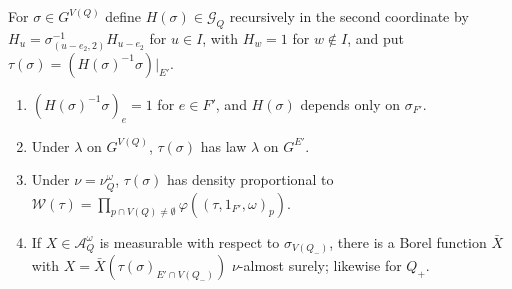 \begin{lemma}\label{lem:axial}
For $\sigma\in G^{V(Q)}$ define $H(\sigma)\in\mathcal G_Q$ recursively in the
second coordinate by $H_u=\sigma_{(u-e_2,2)}^{-1}H_{u-e_2}$ for $u\in I$, with
$H_w=1$ for $w\notin I$, and put $\tau(\sigma)=(H(\sigma)^{-1}\sigma)|_{E'}$.
\begin{enumerate}[label=\textup{(\roman*)},leftmargin=*]
\item $(H(\sigma)^{-1}\sigma)_e=1$ for $e\in F'$, and $H(\sigma)$ depends only
on $\sigma_{F'}$.
\item Under $\lambda$ on $G^{V(Q)}$, $\tau(\sigma)$ has law $\lambda$ on $G^{E'}$.
\item Under $\nu=\nu^\omega_Q$, $\tau(\sigma)$ has density proportional to
$\mathcal W(\tau)=\prod_{p\cap V(Q)\ne\emptyset}\varphi((\tau,1_{F'},\omega)_p)$.
\item If $X\in\mathcal A^\omega_Q$ is measurable with respect to
$\sigma_{V(Q_-)}$, there is a Borel function $\bar X$ with $X=\bar X(\tau(
\sigma)_{E'\cap V(Q_-)})$ $\nu$-almost surely; likewise for $Q_+$.
\end{enumerate}
\end{lemma}

